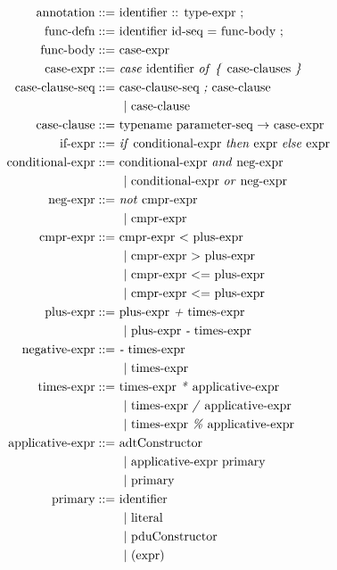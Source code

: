\begin{align*}
  \textnormal{annotation} ::=&~ \textnormal{identifier :: type-expr ;}\\
  \textnormal{func-defn} ::=&~ 
    \textnormal{identifier id-seq = func-body ;}\\
  \textnormal{func-body} ::=&~ \textnormal{case-expr} \\
  \textnormal{case-expr} ::=&~  \textnormal{\emph{case} identifier \emph{of} \emph{\{} case-clauses \emph{\}}}\\
  \textnormal{case-clause-seq} ::=&~  \textnormal{case-clause-seq \emph{;} case-clause}\\
    &~~|~ \textnormal{case-clause}\\
  \textnormal{case-clause} ::=&~ 
    \textnormal{typename parameter-seq $\rightarrow$ case-expr}\\
  \textnormal{if-expr} ::=&~ 
    \textnormal{\emph{if} conditional-expr \emph{then} expr \emph{else} expr}\\
  \textnormal{conditional-expr} ::=&~ 
    \textnormal{conditional-expr \emph{and} neg-expr}\\
    &~~|~ \textnormal{conditional-expr \emph{or}  neg-expr}\\
  \textnormal{neg-expr} ::=&~ 
    \textnormal{\emph{not} cmpr-expr}\\
    &~~|~ \textnormal{cmpr-expr}\\
  \textnormal{cmpr-expr} ::=&~ 
    \textnormal{cmpr-expr $<$ plus-expr}\\
    &~~|~ \textnormal{cmpr-expr $>$ plus-expr}\\
    &~~|~ \textnormal{cmpr-expr $<=$ plus-expr}\\
    &~~|~ \textnormal{cmpr-expr $<=$ plus-expr}\\
  \textnormal{plus-expr} ::=&~ 
    \textnormal{plus-expr \emph{+} times-expr}\\
    &~~|~ \textnormal{plus-expr \emph{-} times-expr}\\
  \textnormal{negative-expr} ::=&~ 
    \textnormal{\emph{-} times-expr}\\
    &~~|~ \textnormal{times-expr}\\
  \textnormal{times-expr} ::=&~ 
    \textnormal{times-expr \emph{*} applicative-expr}\\
    &~~|~ \textnormal{times-expr \emph{/} applicative-expr}\\
    &~~|~ \textnormal{times-expr \emph{\%} applicative-expr}\\
  \textnormal{applicative-expr} ::=&~ 
    \textnormal{adtConstructor}\\
    &~~|~ \textnormal{applicative-expr primary}\\
    &~~|~ \textnormal{primary}\\
  \textnormal{primary} ::=&~ 
    \textnormal{identifier}\\
    &~~|~ \textnormal{literal}\\
    &~~|~ \textnormal{pduConstructor}\\
    &~~|~ \textnormal{(expr)}
\end{align*}

